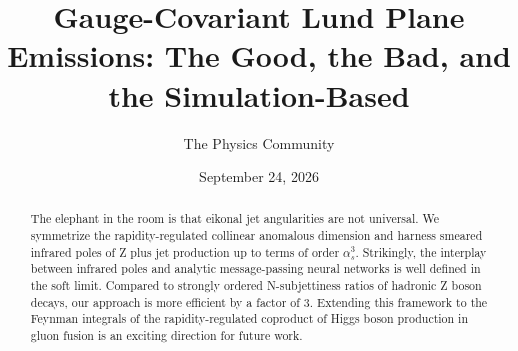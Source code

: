 \documentclass[11pt]{article}
\title{Gauge-Covariant Lund Plane Emissions: The Good, the Bad, and the Simulation-Based}
\author{The Physics Community}
\date{September 24, 2026}
\numberwithin{equation}{section}
\theoremstyle{definition}
\theoremstyle{remark}
\begin{document}
\maketitle
\begin{abstract}
The elephant in the room is that eikonal jet angularities are not
universal. We symmetrize the rapidity-regulated collinear anomalous
dimension and harness smeared infrared poles of Z plus jet production up
to terms of order $\alpha_s^3$. Strikingly, the interplay between
infrared poles and analytic message-passing neural networks is well
defined in the soft limit. Compared to strongly ordered N-subjettiness
ratios of hadronic Z boson decays, our approach is more efficient by a
factor of 3. Extending this framework to the Feynman integrals of the
rapidity-regulated coproduct of Higgs boson production in gluon fusion
is an exciting direction for future work.
\end{abstract}
\tableofcontents




\nocite{*}


\end{document}
